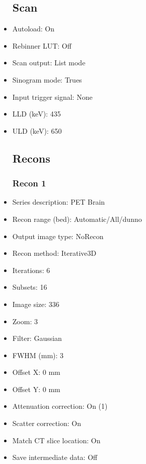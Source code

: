\documentclass[12pt]{article}
\begin{document}
\begin{itemize}
\subsection{Scan}
\item Autoload: On
\item Rebinner LUT: Off
\item Scan output: List mode
\item Sinogram mode: Trues
\item Input trigger signal: None
\item LLD (keV): 435
\item ULD (keV): 650
\subsection{Recons}
\subsubsection{Recon 1}
\item Series description: PET Brain
\item Recon range (bed): Automatic/All/dunno
\item Output image type: NoRecon
\item Recon method: Iterative3D
\item Iterations: 6
\item Subsets: 16
\item Image size: 336
\item Zoom: 3
\item Filter: Gaussian
\item FWHM (mm): 3
\item Offset X: 0 mm
\item Offset Y: 0 mm
\item Attenuation correction: On (1)
\item Scatter correction: On
\item Match CT slice location: On
\item Save intermediate data: Off
\end{itemize}
\end{document}
